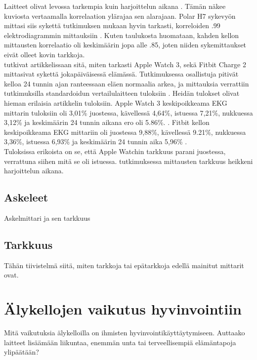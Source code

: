\documentclass[utf8,bachelor,finnish]{bachelor}
\begin{document}
  Laitteet olivat levossa tarkempia kuin harjoittelun aikana \parencite{wang_accuracy_2017}. Tämän näkee kuviosta vertaamalla korrelaation ylärajaa sen alarajaan.
   Polar H7 sykevyön mittasi siis sykettä tutkimuksen mukaan hyvin tarkasti, korreloiden .99 elektrodiagrammin mittauksiin \parencite{wang_accuracy_2017}.
    Kuten taulukosta huomataan, kahden kellon mittausten korrelaatio oli keskimäärin jopa alle .85, joten niiden sykemittaukset eivät olleet kovin tarkkoja.\\
  
  \cite{nelson_accuracy_2019} tutkivat artikkelissaan sitä, miten tarkasti Apple Watch 3, sekä Fitbit Charge 2 mittasivat sykettä jokapäiväisessä elämässä.
   Tutkimuksessa osallistuja pitivät kelloa 24 tunnin ajan ranteessaan eläen normaalia arkea, ja mittauksia verrattiin tutkimuksilla standardoidun
    vertailulaitteen tuloksiin \parencite{nelson_accuracy_2019}. Heidän tulokset olivat hieman erilaisia \cite{wang_accuracy_2017} artikkelin tuloksiin.
     Apple Watch 3 keskipoikkeama EKG mittarin tuloksiin oli 3,01\% juostessa, kävellessä 4,64\%, istuessa 7,21\%, nukkuessa 3,12\% ja keskimäärin 24 tunnin aikana ero oli 5.86\%.
      \parencite{nelson_accuracy_2019}. Fitbit kellon keskipoikkeama EKG mittariin oli juostessa 9,88\%, kävellessä 9.21\%, nukkuessa 3,36\%,
       istuessa 6,93\% ja keskimäärin 24 tunnin aika 5,96\% \parencite{nelson_accuracy_2019}.\\

  Tuloksissa erikoista on se, että Apple Watchin tarkkuus parani juostessa, verrattuna siihen mitä se oli istuessa. \cite{wang_accuracy_2017} tutkimuksessa
   mittausten tarkkuus heikkeni harjoittelun aikana.
    
       


  
   
     


  \section{Askeleet}
  Askelmittari ja sen tarkkuus
  
  \section{Tarkkuus}
  Tähän tiivistelmä siitä, miten tarkkoja tai epätarkkoja edellä mainitut mittarit ovat.
  
  \chapter{Älykellojen vaikutus hyvinvointiin}
  Mitä vaikutuksia älykelloilla on ihmisten hyvinvointikäyttäytymiseen. Auttaako laitteet lisäämään liikuntaa, enemmän unta tai terveellisempiä elämäntapoja ylipäätään?
\end{document}
